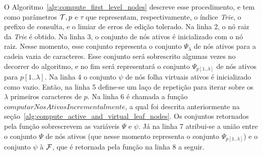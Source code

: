 O Algoritmo~\ref{alg:compute_first_level_nodes} descreve esse procedimento, e tem como parâmetros $\mathcal{T}, p$ e $\tau$ que representam, respectivamente, o índice \textit{Trie}, o prefixo de consulta, e o limiar de erros de edição tolerado. Na linha 2, o nó raiz da \textit{Trie} é obtido. Na linha 3, o conjunto de nós ativos é inicializado com o nó raiz. Nesse momento, esse conjunto representa o conjunto $\Psi_{\lambda}$ de nós ativos para a cadeia vazia de caracteres. Esse conjunto será sobrescrito algumas vezes no decorrer do algoritmo, e no fim será representará o conjunto $\Psi_{p[1..\lambda]}$ de nós ativos para $p[1..\lambda]$. Na linha 4 o conjunto $\psi$ de nós folha virtuais ativos é inicializado como vazio. Então, na linha 5 define-se um laço de repetição para iterar sobre os $\lambda$ primeiros caracteres de $p$. Na linha 6 é chamada a função $computarNosAtivosIncrementalmente$, a qual foi descrita anteriormente na seção~\ref{alg:compute_active_and_virtual_leaf_nodes}. Os conjuntos retornados pela função sobrescrevem as variáveis $\Psi$ e $\psi$. Já na linha 7 atribui-se a união entre o conjunto $\Psi$ de nós ativos (que nesse momento representa o conjunto $\Psi_{p[1..\lambda]}$) e o conjunto $\psi$ à $\mathcal{F}$, que é retornada pela função na linha 8 a seguir.




                    
